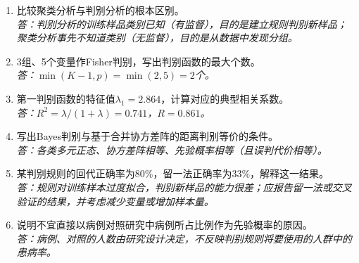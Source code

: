 \begin{fuxi}[复习题]
\begin{enumerate}
\item 比较聚类分析与判别分析的根本区别。\\
\textit{答：判别分析的训练样品类别已知（有监督），目的是建立规则判别新样品；聚类分析事先不知道类别（无监督），目的是从数据中发现分组。}
\item 3组、5个变量作Fisher判别，写出判别函数的最大个数。\\
\textit{答：$\min(K-1,p)=\min(2,5)=2$个。}
\item 第一判别函数的特征值$\lambda_1=2.864$，计算对应的典型相关系数。\\
\textit{答：$R^2=\lambda/(1+\lambda)=0.741$，$R=0.861$。}
\item 写出Bayes判别与基于合并协方差阵的距离判别等价的条件。\\
\textit{答：各类多元正态、协方差阵相等、先验概率相等（且误判代价相等）。}
\item 某判别规则的回代正确率为80\%，留一法正确率为33\%，解释这一结果。\\
\textit{答：规则对训练样本过度拟合，判别新样品的能力很差；应报告留一法或交叉验证的结果，并考虑减少变量或增加样本量。}
\item 说明不宜直接以病例对照研究中病例所占比例作为先验概率的原因。\\
\textit{答：病例、对照的人数由研究设计决定，不反映判别规则将要使用的人群中的患病率。}
\end{enumerate}
\end{fuxi}
